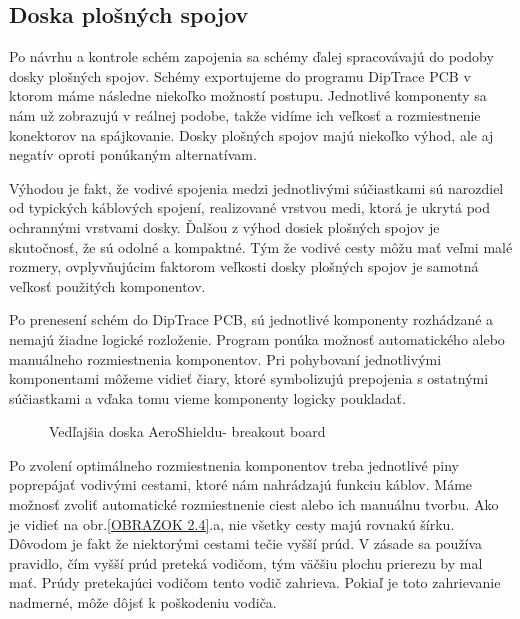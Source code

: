\subsection{Doska plošných spojov}
\label{PCBcka}

Po návrhu a kontrole schém zapojenia sa schémy ďalej spracovávajú do podoby dosky plošných spojov. Schémy exportujeme do programu DipTrace PCB v ktorom máme následne niekoľko možností postupu. Jednotlivé komponenty sa nám už zobrazujú v reálnej podobe, takže vidíme ich veľkosť a rozmiestnenie konektorov na spájkovanie. Dosky plošných spojov majú niekoľko výhod, ale aj negatív oproti ponúkaným alternatívam\cite{dosky}. 

Výhodou je fakt, že vodivé spojenia medzi jednotlivými súčiastkami sú narozdiel od typických káblových spojení, realizované vrstvou medi, ktorá je ukrytá pod ochrannými vrstvami dosky. Ďalšou z výhod dosiek plošných spojov je skutočnosť, že sú odolné a kompaktné\cite{PCBlife}. Tým že vodivé cesty môžu mať veľmi malé rozmery, ovplyvňujúcim faktorom veľkosti dosky plošných spojov je samotná veľkosť použitých komponentov. 

Po prenesení schém do DipTrace PCB, sú jednotlivé komponenty rozhádzané a nemajú žiadne logické rozloženie. Program ponúka možnosť automatického alebo manuálneho rozmiestnenia komponentov. Pri pohybovaní jednotlivými komponentami môžeme vidieť čiary, ktoré symbolizujú prepojenia s ostatnými súčiastkami a vďaka tomu vieme komponenty logicky poukladať.

\begin{figure}[!tbh]
	\hfill
	\hfill
	\hfill
	\caption{Vedľajšia doska AeroShieldu- breakout board}\label{OBRAZOK 2.6}
\end{figure}

Po zvolení optimálneho rozmiestnenia komponentov treba jednotlivé piny poprepájať vodivými cestami, ktoré nám nahrádzajú funkciu káblov. Máme možnosť zvoliť automatické rozmiestnenie ciest alebo ich manuálnu tvorbu. Ako je vidieť na obr.\ref{OBRAZOK 2.4}.a, nie všetky cesty majú rovnakú šírku. Dôvodom je fakt že niektorými cestami tečie vyšší prúd. V zásade sa používa pravidlo, čím vyšší prúd preteká vodičom, tým väčšiu plochu prierezu by mal mať. Prúdy pretekajúci vodičom tento vodič zahrieva. Pokiaľ je toto zahrievanie nadmerné, môže dôjsť k poškodeniu vodiča.  

